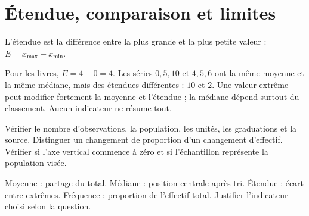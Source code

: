 \documentclass[../cours_3e.tex]{subfiles}
\begin{document}
\section{Étendue, comparaison et limites}
\begin{definition}
L'étendue est la différence entre la plus grande et la plus petite valeur : $E=x_{\max}-x_{\min}$.
\end{definition}
Pour les livres, $E=4-0=4$. Les séries $0,5,10$ et $4,5,6$ ont la même moyenne et la même médiane, mais des étendues différentes : $10$ et $2$.
Une valeur extrême peut modifier fortement la moyenne et l'étendue ; la médiane dépend surtout du classement. Aucun indicateur ne résume tout.
\begin{methode}
Vérifier le nombre d'observations, la population, les unités, les graduations et la source. Distinguer un changement de proportion d'un changement d'effectif. Vérifier si l'axe vertical commence à zéro et si l'échantillon représente la population visée.
\end{methode}
\begin{retenir}
Moyenne : partage du total. Médiane : position centrale après tri. Étendue : écart entre extrêmes. Fréquence : proportion de l'effectif total. Justifier l'indicateur choisi selon la question.
\end{retenir}
\end{document}
